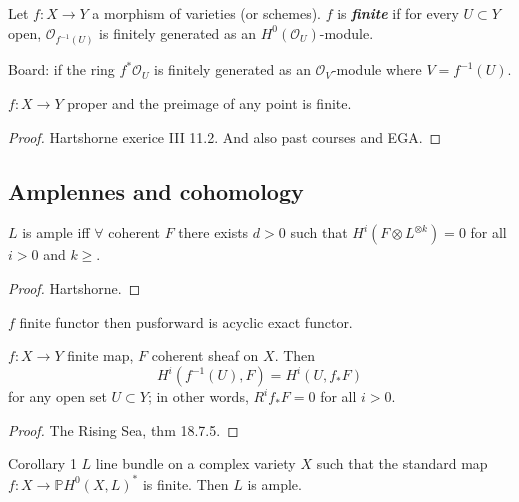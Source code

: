 \begin{defn}\leavevmode
	Let $f:X\longrightarrow Y$ a morphism of varieties (or schemes). $f$ is \textit{\textbf{finite}} if for every $U\subset Y$ open, $\mathcal{O}_{f^{-1}(U)}$ is finitely generated as an $H^{0}(\mathcal{O}_U)$-module.

	{\color{5}Board:} if the ring $f^*\mathcal{O}_U$ is finitely generated as an $\mathcal{O}_V$-module where $V=f^{-1}(U)$.
\end{defn}

\begin{thm}\leavevmode
	$f:X\longrightarrow Y$ proper and the preimage of any point is finite.
\end{thm}

\begin{proof}\leavevmode
	Hartshorne exerice III 11.2. And also past courses and EGA.
\end{proof}

\subsection{Amplennes and cohomology}

\begin{thm}\leavevmode
	$L$ is ample iff $\forall $ coherent $F$ there exists $d>0$ such that  $H^{i}(F\otimes L^{\otimes k})=0$ for all $i>0$ and  $k\geq $.
\end{thm}

\begin{proof}\leavevmode
	Hartshorne.
\end{proof}

\begin{thm}\leavevmode
$f$ finite functor then pusforward is acyclic exact functor.

$f:X\longrightarrow Y$ finite map, $F$ coherent sheaf on $X$. Then
\[H^{i}(f^{-1}(U),F)=H^{i}(U,f_* F)\]
for any open set $U\subset Y$; in other words, $R^if_* F=0$ for all $i>0$.
\end{thm}

\begin{proof}\leavevmode
	The Rising Sea, thm 18.7.5.
\end{proof}

\begin{idea4}{Corollary 1}\leavevmode
	$L$ line bundle on a complex variety $X$ such that the standard map $f:X\longrightarrow \mathbb{P}H^{0}(X,L)^*$ is finite. Then $L$ is ample.
\end{idea4}

